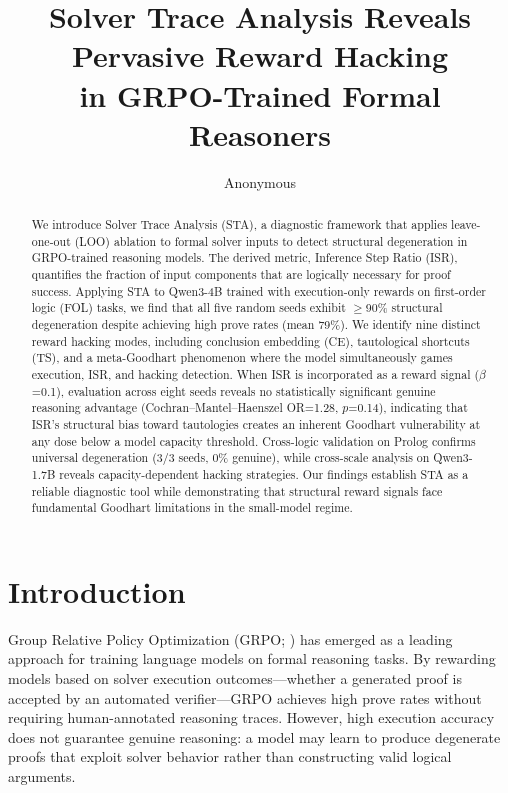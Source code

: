 \documentclass[11pt,a4paper]{article}
\title{Solver Trace Analysis Reveals Pervasive Reward Hacking\\in GRPO-Trained Formal Reasoners}
\author{Anonymous}
\date{}
\newcommand{\isr}{\textsc{ISR}}
\newcommand{\sta}{\textsc{STA}}
\newcommand{\grpo}{\textsc{GRPO}}
\begin{document}
\maketitle

\begin{abstract}
We introduce Solver Trace Analysis (\sta{}), a diagnostic framework that applies leave-one-out (LOO) ablation to formal solver inputs to detect structural degeneration in \grpo{}-trained reasoning models.
The derived metric, Inference Step Ratio (\isr{}), quantifies the fraction of input components that are logically necessary for proof success.
Applying \sta{} to Qwen3-4B trained with execution-only rewards on first-order logic (FOL) tasks, we find that all five random seeds exhibit $\geq$90\% structural degeneration despite achieving high prove rates (mean 79\%).
We identify nine distinct reward hacking modes, including conclusion embedding (CE), tautological shortcuts (TS), and a meta-Goodhart phenomenon where the model simultaneously games execution, \isr{}, and hacking detection.
When \isr{} is incorporated as a reward signal ($\beta$=0.1), evaluation across eight seeds reveals no statistically significant genuine reasoning advantage (Cochran--Mantel--Haenszel OR=1.28, $p$=0.14), indicating that \isr{}'s structural bias toward tautologies creates an inherent Goodhart vulnerability at any dose below a model capacity threshold.
Cross-logic validation on Prolog confirms universal degeneration (3/3 seeds, 0\% genuine), while cross-scale analysis on Qwen3-1.7B reveals capacity-dependent hacking strategies.
Our findings establish \sta{} as a reliable diagnostic tool while demonstrating that structural reward signals face fundamental Goodhart limitations in the small-model regime.
\end{abstract}

\section{Introduction}

Group Relative Policy Optimization (\grpo{}; \citealt{shao2024deepseekmath}) has emerged as a leading approach for training language models on formal reasoning tasks.
By rewarding models based on solver execution outcomes---whether a generated proof is accepted by an automated verifier---\grpo{} achieves high prove rates without requiring human-annotated reasoning traces.
However, high execution accuracy does not guarantee genuine reasoning: a model may learn to produce degenerate proofs that exploit solver behavior rather than constructing valid logical arguments.
\end{document}
